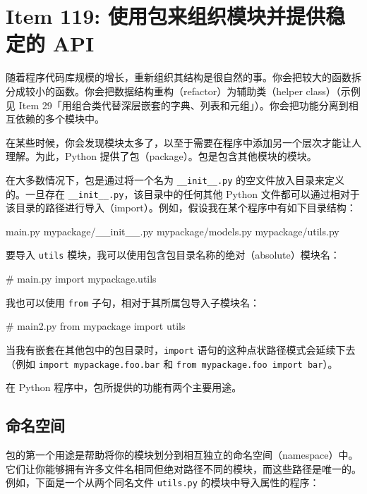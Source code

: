 \section{Item 119: 使用包来组织模块并提供稳定的 API}

随着程序代码库规模的增长，重新组织其结构是很自然的事。你会把较大的函数拆分成较小的函数。你会把数据结构重构（refactor）为辅助类（helper class）（示例见 Item 29「用组合类代替深层嵌套的字典、列表和元组」）。你会把功能分离到相互依赖的多个模块中。

在某些时候，你会发现模块太多了，以至于需要在程序中添加另一个层次才能让人理解。为此，Python 提供了包（package）。包是包含其他模块的模块。

在大多数情况下，包是通过将一个名为 \texttt{\_\_init\_\_.py} 的空文件放入目录来定义的。一旦存在 \texttt{\_\_init\_\_.py}，该目录中的任何其他 Python 文件都可以通过相对于该目录的路径进行导入（import）。例如，假设我在某个程序中有如下目录结构：

\begin{codebox}[python]
main.py
mypackage/__init__.py
mypackage/models.py
mypackage/utils.py
\end{codebox}

要导入 \texttt{utils} 模块，我可以使用包含包目录名称的绝对（absolute）模块名：

\begin{codebox}[python]
# main.py
import mypackage.utils
\end{codebox}

我也可以使用 \texttt{from} 子句，相对于其所属包导入子模块名：

\begin{codebox}[python]
# main2.py
from mypackage import utils
\end{codebox}

当我有嵌套在其他包中的包目录时，\texttt{import} 语句的这种点状路径模式会延续下去（例如 \texttt{import mypackage.foo.bar} 和 \texttt{from mypackage.foo import bar}）。

在 Python 程序中，包所提供的功能有两个主要用途。

\subsection{命名空间}

包的第一个用途是帮助将你的模块划分到相互独立的命名空间（namespace）中。它们让你能够拥有许多文件名相同但绝对路径不同的模块，而这些路径是唯一的。例如，下面是一个从两个同名文件 \texttt{utils.py} 的模块中导入属性的程序：

